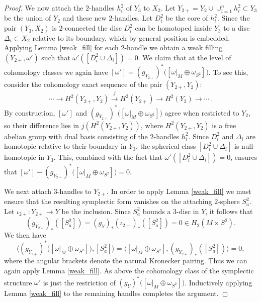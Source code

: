 \documentclass[12pt]{amsart}
\theoremstyle{remark}
\begin{document}
\begin{proof}
We now attach the $2$-handles $h^2_i$ of $Y_3$ to $X_2$. 
Let $Y_{2+} = Y_2 \cup \cup_{i=1}^n h^2_i \subset Y_3$ be the union of $Y_2$
and these new $2$-handles.  Let $D^2_i$ be the core of $h^2_i$. Since the pair $(Y_3, X_2)$ is $2$-connected 
the disc $D^2_i$ can be homotoped  inside $Y_3$ to a disc $\Delta_i \subset X_2$ relative to its boundary, which by general position is embedded. Applying Lemma \ref{weak_fill} for each $2$-handle we obtain a weak filling $(Y_{2+},\omega')$ such that $\omega'([D^2_i \cup \Delta_i]) = 0$.  
We claim that at the level of cohomology classes we again have 
$[\omega'] = (g_{Y_{2+}})^*\bigl( [\omega|_M \oplus \omega_{S^2}] \bigr)$.
To see this, consider the cohomology exact sequence
of the pair $(Y_{2+}, Y_2)$:
%
\[ \cdots \longrightarrow H^2(Y_{2+}, Y_2) \stackrel{j}\longrightarrow H^2(Y_{2+}) \longrightarrow H^2(Y_2) \longrightarrow \cdots~. \]
%
By construction, $[\omega']$ and $(g_{Y_{2+}})^*\bigl( [\omega|_M \oplus \omega_{S^2}] \bigr)$ 
agree when restricted to $Y_2$, so their difference lies in $j(H^2(Y_{2+}, Y_2))$,
where $H^2(Y_{2+}, Y_2)$ is a free abelian group with dual basis consisting of the $2$-handles $h^2_i$.
Since $D_i^2$ and $\Delta_i$ are homotopic relative to their boundary in $Y_3$, the spherical class $[D_i^2 \cup \Delta_i]$ is null-homotopic in $Y_3$.
This, combined with the fact that $\omega'([D^2_i \cup \Delta_i]) = 0$, ensures that
$[\omega'] - (g_{Y_{2+}})^*\bigl( [\omega|_M \oplus \omega_{S^2}] \bigr) = 0$.

We next attach $3$-handles to $Y_{2+}$. 
In order to apply Lemma \ref{weak_fill} we must ensure that the resulting symplectic form vanishes on the attaching $2$-sphere $S^2_a$. Let $\iota_{2+} \colon Y_{2+} \to Y$ be the inclusion.  
Since $S^2_a$ bounds a $3$-disc in $Y$, it follows that 
$$(g_{Y_{2+}})_*([S^2_a]) = (g_Y)_*(\iota_{2+})_*([S^2_a]) = 0 \in H_2(M \times S^2).$$
We then have
%
$$\langle (g_{Y_{2+}})^*\bigl( [\omega|_M \oplus \omega_{S^2}] \bigr), [S^2_a] \rangle =
\langle [\omega|_M \oplus \omega_{S^2}], (g_{Y_{2+}})_*([S^2_a]) \rangle 
= 0,$$
where the angular brackets denote the natural Kronecker pairing. Thus we can again apply Lemma \ref{weak_fill}. As above the cohomology class of the symplectic structure $\omega'$ is  just the restriction of $(g_{Y})^*\bigl( [\omega|_M \oplus \omega_{S^2}] \bigr)$. Inductively applying Lemma \ref{weak_fill} to the remaining handles completes the argument.\end{proof}
\end{document}
